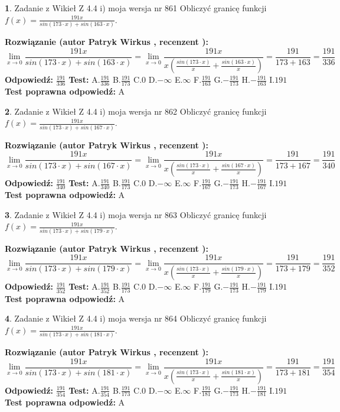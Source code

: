 \documentclass[12pt, a4paper]{article}
\theoremstyle{definition} %
\newtheorem{zad}{}
\newcommand{\zadStart}[1]{\begin{zad}#1\newline}
\newcommand{\zadStop}{\end{zad}}
\newcommand{\rozwStart}[2]{\noindent \textbf{Rozwiązanie (autor #1 , recenzent #2): }\newline}
\newcommand{\rozwStop}{\newline}
\newcommand{\odpStart}{\noindent \textbf{Odpowiedź:}\newline}
\newcommand{\odpStop}{\newline}
\newcommand{\testStart}{\noindent \textbf{Test:}\newline}
\newcommand{\testStop}{\newline}
\newcommand{\kluczStart}{\noindent \textbf{Test poprawna odpowiedź:}\newline}
\newcommand{\kluczStop}{\newline}
\begin{document}
\zadStart{Zadanie z Wikieł Z 4.4 i) moja wersja nr 861}
Obliczyć granicę funkcji $f(x)=\frac{191x}{sin(173\cdot x) +sin(163\cdot x)}$.
\zadStop
\rozwStart{Patryk Wirkus}{}
$$\lim\limits_{x\to 0}\frac{191x}{sin(173\cdot x) +sin(163\cdot x)}=\lim\limits_{x\to 0}\frac{191x}{x(\frac{sin(173\cdot x)}{x}+\frac{sin(163\cdot x)}{x})}=\frac{191}{173+163} = \frac{191}{336}$$
\rozwStop
\odpStart
$\frac{191}{336}$
\odpStop
\testStart
A.$\frac{191}{336}$
B.$\frac{191}{173}$
C.$0$
D.$-\infty$
E.$\infty$
F.$\frac{191}{163}$
G.$-\frac{191}{173}$
H.$-\frac{191}{163}$
I.$191$
\testStop
\kluczStart
A
\kluczStop



\zadStart{Zadanie z Wikieł Z 4.4 i) moja wersja nr 862}
Obliczyć granicę funkcji $f(x)=\frac{191x}{sin(173\cdot x) +sin(167\cdot x)}$.
\zadStop
\rozwStart{Patryk Wirkus}{}
$$\lim\limits_{x\to 0}\frac{191x}{sin(173\cdot x) +sin(167\cdot x)}=\lim\limits_{x\to 0}\frac{191x}{x(\frac{sin(173\cdot x)}{x}+\frac{sin(167\cdot x)}{x})}=\frac{191}{173+167} = \frac{191}{340}$$
\rozwStop
\odpStart
$\frac{191}{340}$
\odpStop
\testStart
A.$\frac{191}{340}$
B.$\frac{191}{173}$
C.$0$
D.$-\infty$
E.$\infty$
F.$\frac{191}{167}$
G.$-\frac{191}{173}$
H.$-\frac{191}{167}$
I.$191$
\testStop
\kluczStart
A
\kluczStop



\zadStart{Zadanie z Wikieł Z 4.4 i) moja wersja nr 863}
Obliczyć granicę funkcji $f(x)=\frac{191x}{sin(173\cdot x) +sin(179\cdot x)}$.
\zadStop
\rozwStart{Patryk Wirkus}{}
$$\lim\limits_{x\to 0}\frac{191x}{sin(173\cdot x) +sin(179\cdot x)}=\lim\limits_{x\to 0}\frac{191x}{x(\frac{sin(173\cdot x)}{x}+\frac{sin(179\cdot x)}{x})}=\frac{191}{173+179} = \frac{191}{352}$$
\rozwStop
\odpStart
$\frac{191}{352}$
\odpStop
\testStart
A.$\frac{191}{352}$
B.$\frac{191}{173}$
C.$0$
D.$-\infty$
E.$\infty$
F.$\frac{191}{179}$
G.$-\frac{191}{173}$
H.$-\frac{191}{179}$
I.$191$
\testStop
\kluczStart
A
\kluczStop



\zadStart{Zadanie z Wikieł Z 4.4 i) moja wersja nr 864}
Obliczyć granicę funkcji $f(x)=\frac{191x}{sin(173\cdot x) +sin(181\cdot x)}$.
\zadStop
\rozwStart{Patryk Wirkus}{}
$$\lim\limits_{x\to 0}\frac{191x}{sin(173\cdot x) +sin(181\cdot x)}=\lim\limits_{x\to 0}\frac{191x}{x(\frac{sin(173\cdot x)}{x}+\frac{sin(181\cdot x)}{x})}=\frac{191}{173+181} = \frac{191}{354}$$
\rozwStop
\odpStart
$\frac{191}{354}$
\odpStop
\testStart
A.$\frac{191}{354}$
B.$\frac{191}{173}$
C.$0$
D.$-\infty$
E.$\infty$
F.$\frac{191}{181}$
G.$-\frac{191}{173}$
H.$-\frac{191}{181}$
I.$191$
\testStop
\kluczStart
A
\kluczStop
\end{document}
